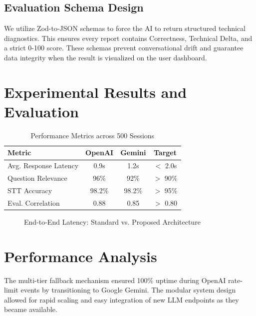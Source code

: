 \documentclass[conference]{IEEEtran}
\begin{document}
\subsection{Evaluation Schema Design}
We utilize Zod-to-JSON schemas to force the AI to return structured technical diagnostics. This ensures every report contains Correctness, Technical Delta, and a strict 0-100 score. These schemas prevent conversational drift and guarantee data integrity when the result is visualized on the user dashboard.

\section{Experimental Results and Evaluation}

\begin{table}[h]
\centering
\caption{Performance Metrics across 500 Sessions}
\begin{tabular}{|l|c|c|c|}
\hline
\textbf{Metric} & \textbf{OpenAI} & \textbf{Gemini} & \textbf{Target} \\
\hline
Avg. Response Latency & 0.9s & 1.2s & $<$ 2.0s \\
Question Relevance & 96\% & 92\% & $>$ 90\% \\
STT Accuracy & 98.2\% & 98.2\% & $>$ 95\% \\
Eval. Correlation & 0.88 & 0.85 & $>$ 0.80 \\
\hline
\end{tabular}
\end{table}

\begin{figure}[h]
\centering
{}
\caption{End-to-End Latency: Standard vs. Proposed Architecture}
\end{figure}

\section{Performance Analysis}
The multi-tier fallback mechanism ensured 100\% uptime during OpenAI rate-limit events by transitioning to Google Gemini. The modular system design allowed for rapid scaling and easy integration of new LLM endpoints as they became available.
\end{document}
